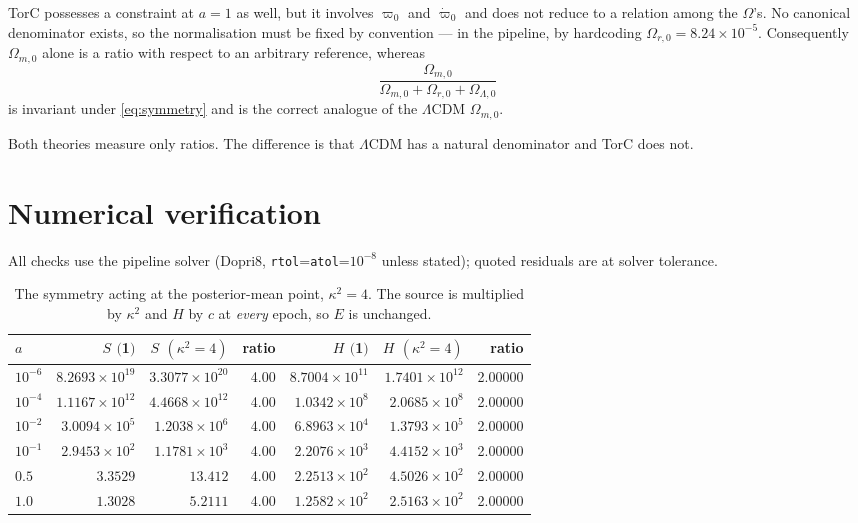 \documentclass[11pt]{article}
\newcommand{\Om}{\Omega_{m,0}}
\newcommand{\Or}{\Omega_{r,0}}
\newcommand{\OL}{\Omega_{\Lambda,0}}
\begin{document}
TorC possesses a constraint at $a=1$ as well, but it involves $\varpi_0$ and
$\dot\varpi_0$ and does not reduce to a relation among the $\Omega$'s. No
canonical denominator exists, so the normalisation must be fixed by convention
--- in the pipeline, by hardcoding $\Or=8.24\times10^{-5}$. Consequently $\Om$
alone is a ratio with respect to an arbitrary reference, whereas
\begin{equation}
\frac{\Om}{\Om+\Or+\OL}
\end{equation}
is invariant under \eqref{eq:symmetry} and is the correct analogue of the
$\Lambda$CDM $\Om$.

Both theories measure only ratios. The difference is that $\Lambda$CDM has a
natural denominator and TorC does not.

\section{Numerical verification}

All checks use the pipeline solver (Dopri8, \texttt{rtol}=\texttt{atol}=$10^{-8}$
unless stated); quoted residuals are at solver tolerance.

\begin{table}[h]\centering
\caption{The symmetry acting at the posterior-mean point, $\kappa^2=4$. The source
is multiplied by $\kappa^2$ and $H$ by $c$ at \emph{every} epoch, so $E$ is
unchanged.}
\begin{tabular}{lrrrrrr}
\toprule
$a$ & $S$ $($\kappa{=}1$)$ & $S$ $(\kappa^2{=}4)$ & ratio & $H$ $($\kappa{=}1$)$ & $H$ $(\kappa^2{=}4)$ & ratio \\
\midrule
$10^{-6}$ & $8.2693\times10^{19}$ & $3.3077\times10^{20}$ & 4.00 & $8.7004\times10^{11}$ & $1.7401\times10^{12}$ & 2.00000 \\
$10^{-4}$ & $1.1167\times10^{12}$ & $4.4668\times10^{12}$ & 4.00 & $1.0342\times10^{8}$ & $2.0685\times10^{8}$ & 2.00000 \\
$10^{-2}$ & $3.0094\times10^{5}$ & $1.2038\times10^{6}$ & 4.00 & $6.8963\times10^{4}$ & $1.3793\times10^{5}$ & 2.00000 \\
$10^{-1}$ & $2.9453\times10^{2}$ & $1.1781\times10^{3}$ & 4.00 & $2.2076\times10^{3}$ & $4.4152\times10^{3}$ & 2.00000 \\
$0.5$ & $3.3529$ & $13.412$ & 4.00 & $2.2513\times10^{2}$ & $4.5026\times10^{2}$ & 2.00000 \\
$1.0$ & $1.3028$ & $5.2111$ & 4.00 & $1.2582\times10^{2}$ & $2.5163\times10^{2}$ & 2.00000 \\
\bottomrule
\end{tabular}
\end{table}
\end{document}
